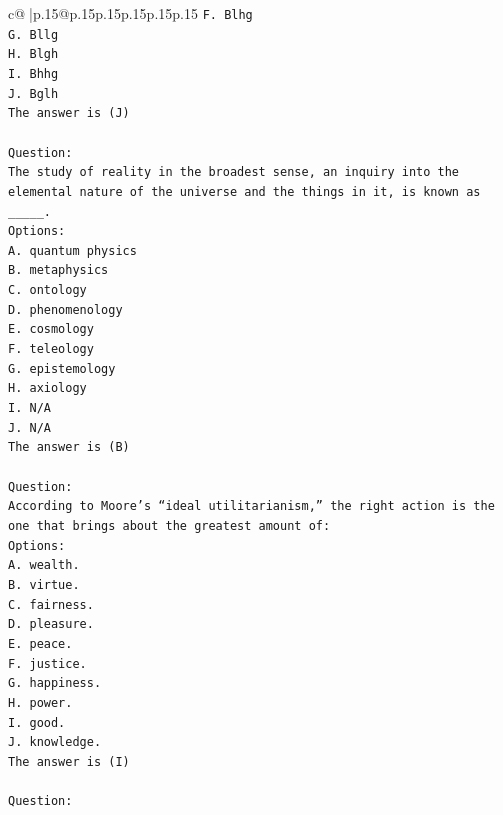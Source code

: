 \documentclass{article}
\begin{document}
{\begin{supertabular}{c@{$\;$}|p{.15\linewidth}@{}p{.15\linewidth}p{.15\linewidth}p{.15\linewidth}p{.15\linewidth}p{.15\linewidth}}
{{{\texttt{F. Blhg} \\
\texttt{G. Bllg} \\
\texttt{H. Blgh} \\
\texttt{I. Bhhg} \\
\texttt{J. Bglh} \\
\texttt{The answer is (J)} \\
\\ 
\texttt{Question:} \\
\texttt{The study of reality in the broadest sense, an inquiry into the elemental nature of the universe and the things in it, is known as \_\_\_\_\_.} \\
\texttt{Options:} \\
\texttt{A. quantum physics} \\
\texttt{B. metaphysics} \\
\texttt{C. ontology} \\
\texttt{D. phenomenology} \\
\texttt{E. cosmology} \\
\texttt{F. teleology} \\
\texttt{G. epistemology} \\
\texttt{H. axiology} \\
\texttt{I. N/A} \\
\texttt{J. N/A} \\
\texttt{The answer is (B)} \\
\\ 
\texttt{Question:} \\
\texttt{According to Moore’s “ideal utilitarianism,” the right action is the one that brings about the greatest amount of:} \\
\texttt{Options:} \\
\texttt{A. wealth.} \\
\texttt{B. virtue.} \\
\texttt{C. fairness.} \\
\texttt{D. pleasure.} \\
\texttt{E. peace.} \\
\texttt{F. justice.} \\
\texttt{G. happiness.} \\
\texttt{H. power.} \\
\texttt{I. good.} \\
\texttt{J. knowledge.} \\
\texttt{The answer is (I)} \\
\\ 
\texttt{Question:} \\
}}}
\end{supertabular}}
\end{document}
